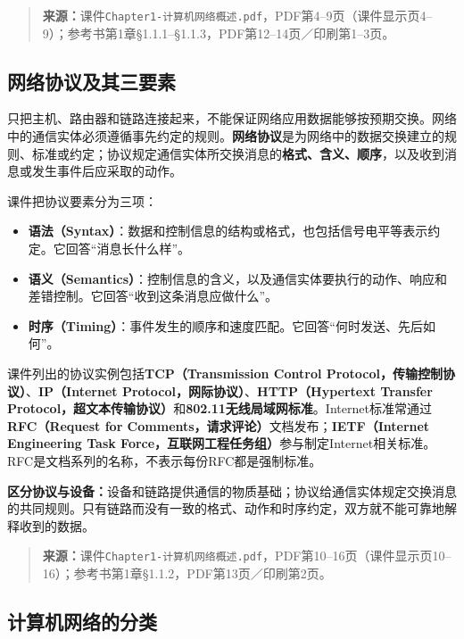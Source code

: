 \begin{quote}\small\textbf{来源：}课件\texttt{Chapter1-计算机网络概述.pdf}，PDF第4--9页（课件显示页4--9）；参考书第1章§1.1.1--§1.1.3，PDF第12--14页／印刷第1--3页。\end{quote}
\annotationarea[4]

\subsection{网络协议及其三要素}

只把主机、路由器和链路连接起来，不能保证网络应用数据能够按预期交换。网络中的通信实体必须遵循事先约定的规则。\textbf{网络协议}是为网络中的数据交换建立的规则、标准或约定；协议规定通信实体所交换消息的\textbf{格式、含义、顺序}，以及收到消息或发生事件后应采取的动作。

课件把协议要素分为三项：
\begin{itemize}
  \item \textbf{语法（Syntax）}：数据和控制信息的结构或格式，也包括信号电平等表示约定。它回答“消息长什么样”。
  \item \textbf{语义（Semantics）}：控制信息的含义，以及通信实体要执行的动作、响应和差错控制。它回答“收到这条消息应做什么”。
  \item \textbf{时序（Timing）}：事件发生的顺序和速度匹配。它回答“何时发送、先后如何”。
\end{itemize}

课件列出的协议实例包括\textbf{TCP（Transmission Control Protocol，传输控制协议）}、\textbf{IP（Internet Protocol，网际协议）}、\textbf{HTTP（Hypertext Transfer Protocol，超文本传输协议）}和\textbf{802.11无线局域网标准}。Internet标准常通过\textbf{RFC（Request for Comments，请求评论）}文档发布；\textbf{IETF（Internet Engineering Task Force，互联网工程任务组）}参与制定Internet相关标准。RFC是文档系列的名称，不表示每份RFC都是强制标准。

\textbf{区分协议与设备：}设备和链路提供通信的物质基础；协议给通信实体规定交换消息的共同规则。只有链路而没有一致的格式、动作和时序约定，双方就不能可靠地解释收到的数据。

\begin{quote}\small\textbf{来源：}课件\texttt{Chapter1-计算机网络概述.pdf}，PDF第10--16页（课件显示页10--16）；参考书第1章§1.1.2，PDF第13页／印刷第2页。\end{quote}
\annotationarea[4]

\subsection{计算机网络的分类}

